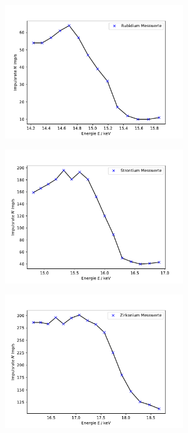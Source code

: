 \begin{figure}
    \centering
    \includegraphics[width=0.7\textwidth]{plots/Rubidium.pdf}
    \caption{}
\end{figure}
\begin{figure}
    \centering
    \includegraphics[width=0.7\textwidth]{plots/Strontium.pdf}
    \caption{}
\end{figure}
\begin{figure}
    \centering
    \includegraphics[width=0.7\textwidth]{plots/Zirkonium.pdf}
    \caption{}
\end{figure}
